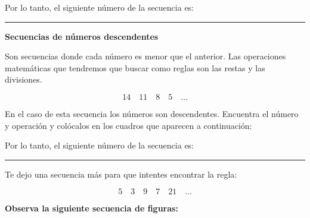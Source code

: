 \documentclass[12pt,a4paper]{article}
\begin{document}
\begin{tcolorbox}[colback=fondorosa,colframe=rojoclaro,title=MINI-EXPLICACIONES: SECUENCIAS DE NÚMEROS,breakable]
\begin{itemize}
    \vspace{0.5cm}

    Por lo tanto, el siguiente número de la secuencia es: \rule{2cm}{0.4pt}
\end{itemize}

\textbf{Secuencias de números descendentes}

Son secuencias donde cada número es menor que el anterior. Las operaciones matemáticas que tendremos que buscar como reglas son las restas y las divisiones.

\[ 14 \quad 11 \quad 8 \quad 5 \quad \ldots \]

En el caso de esta secuencia los números son descendentes. Encuentra el número y operación y colócalos en los cuadros que aparecen a continuación:

\vspace{0.5cm}

Por lo tanto, el siguiente número de la secuencia es: \rule{2cm}{0.4pt}

Te dejo una secuencia más para que intentes encontrar la regla:

\[ 5 \quad 3 \quad 9 \quad 7 \quad 21 \quad \ldots \]

\end{tcolorbox}

\vspace{1cm}

\textbf{Observa la siguiente secuencia de figuras:}

\begin{center}
\end{center}
\end{document}

